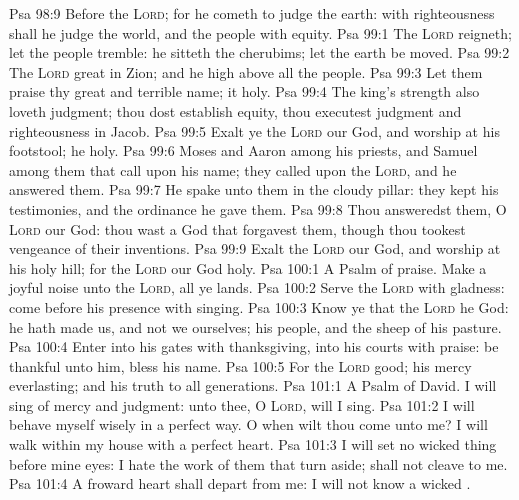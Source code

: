 \vs Psa 98:9 Before the \textsc{Lord}; for he cometh to judge the earth: with righteousness shall he judge the world, and the people with equity.
\vs Psa 99:1 The \textsc{Lord} reigneth; let the people tremble: he sitteth  the cherubims; let the earth be moved.
\vs Psa 99:2 The \textsc{Lord}  great in Zion; and he  high above all the people.
\vs Psa 99:3 Let them praise thy great and terrible name;  it  holy.
\vs Psa 99:4 The king's strength also loveth judgment; thou dost establish equity, thou executest judgment and righteousness in Jacob.
\vs Psa 99:5 Exalt ye the \textsc{Lord} our God, and worship at his footstool;  he  holy.
\vs Psa 99:6 Moses and Aaron among his priests, and Samuel among them that call upon his name; they called upon the \textsc{Lord}, and he answered them.
\vs Psa 99:7 He spake unto them in the cloudy pillar: they kept his testimonies, and the ordinance  he gave them.
\vs Psa 99:8 Thou answeredst them, O \textsc{Lord} our God: thou wast a God that forgavest them, though thou tookest vengeance of their inventions.
\vs Psa 99:9 Exalt the \textsc{Lord} our God, and worship at his holy hill; for the \textsc{Lord} our God  holy.
\vs Psa 100:1 A Psalm of praise. Make a joyful noise unto the \textsc{Lord}, all ye lands.
\vs Psa 100:2 Serve the \textsc{Lord} with gladness: come before his presence with singing.
\vs Psa 100:3 Know ye that the \textsc{Lord} he  God:  he  hath made us, and not we ourselves;  his people, and the sheep of his pasture.
\vs Psa 100:4 Enter into his gates with thanksgiving,  into his courts with praise: be thankful unto him,  bless his name.
\vs Psa 100:5 For the \textsc{Lord}  good; his mercy  everlasting; and his truth  to all generations.
\vs Psa 101:1 A Psalm of David. I will sing of mercy and judgment: unto thee, O \textsc{Lord}, will I sing.
\vs Psa 101:2 I will behave myself wisely in a perfect way. O when wilt thou come unto me? I will walk within my house with a perfect heart.
\vs Psa 101:3 I will set no wicked thing before mine eyes: I hate the work of them that turn aside;  shall not cleave to me.
\vs Psa 101:4 A froward heart shall depart from me: I will not know a wicked .
